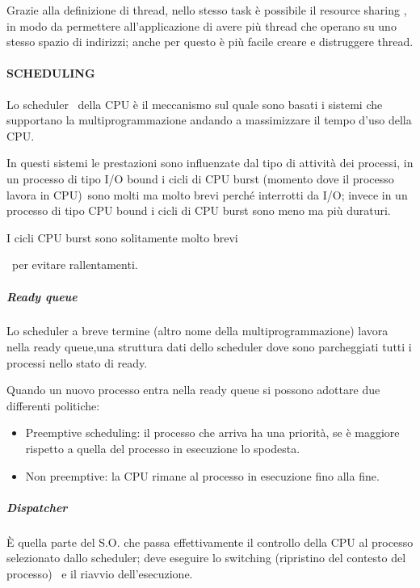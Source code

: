 \documentclass[
]{article}
\providecommand{\tightlist}{%
  \setlength{\itemsep}{0pt}\setlength{\parskip}{0pt}}
\begin{document}
{Grazie alla definizione di thread, nello stesso task è possibile il
resource sharing , in modo da permettere all'applicazione di avere più
thread che operano su uno stesso spazio di indirizzi; anche per questo è
più facile creare e distruggere thread.}

{}

{}

\paragraph{\texorpdfstring{{SCHEDULING}}{SCHEDULING}}\label{h.jr05k81i48zz}

{Lo scheduler ~della CPU è il meccanismo sul quale sono basati i sistemi
che supportano la multiprogrammazione andando a massimizzare il tempo
d'uso della CPU.}

{In questi sistemi le prestazioni sono influenzate dal tipo di attività
dei processi, in un processo di tipo I/O bound i cicli di }{CPU burst
(momento dove il processo lavora in CPU)}{~sono molti ma molto brevi
perché interrotti da I/O; invece in un processo di tipo CPU bound i
cicli di CPU burst sono meno ma più duraturi.}

{}

{I cicli CPU burst sono solitamente molto brevi}

{~per evitare rallentamenti.}

\subparagraph{\texorpdfstring{{Ready
queue}}{Ready queue}}\label{h.p5wn5yds5b2}

{Lo scheduler a breve termine (altro nome della multiprogrammazione)
lavora nella ready queue,una struttura dati dello scheduler dove sono
parcheggiati tutti i processi nello stato di ready.}

{Quando un nuovo processo entra nella ready queue si possono adottare
due differenti politiche: }

\begin{itemize}
\tightlist
\item
  {Preemptive scheduling: il processo che arriva ha una priorità, se è
  maggiore rispetto a quella del processo in esecuzione lo spodesta.}
\item
  {Non preemptive: la CPU rimane al processo in esecuzione fino alla
  fine.}
\end{itemize}

{}

\subparagraph{\texorpdfstring{{Dispatcher}}{Dispatcher}}\label{h.w8478h2x9e96}

{È quella parte del S.O. che passa effettivamente il controllo della CPU
al processo selezionato dallo scheduler; deve eseguire lo switching
(ripristino del contesto del processo) ~e il riavvio dell'esecuzione.}
\end{document}

